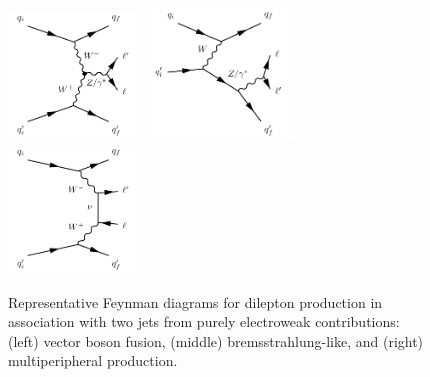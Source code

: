 \begin{figure}[htb] {
\centering
\includegraphics[width=0.315\textwidth]{figures/ss-exclboson-z2j-vbfz_diagram.pdf}
\includegraphics[width=0.35\textwidth]{figures/ss-exclboson-z2j-bckg3_diagram.pdf}
\includegraphics[width=0.315\textwidth]{figures/ss-exclboson-z2j-bckg1_diagram.pdf}
\caption{
Representative Feynman diagrams for dilepton production in association
with two jets from purely electroweak contributions:
(left) vector boson fusion,
(middle) bremsstrahlung-like,
and (right) multiperipheral production.
\label{fig:ss-exclboson-z2j-sigdiagram}}

}
\end{figure}


